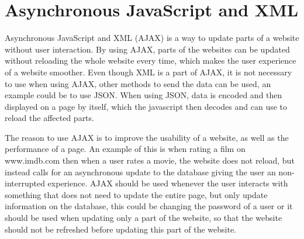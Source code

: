 \section{Asynchronous JavaScript and XML}
Asynchronous JavaScript and XML (AJAX) is a way to update parts of a website without user interaction.
By using AJAX, parts of the websites can be updated without reloading the whole website every time, which makes the user experience of a website smoother.
Even though XML is a part of AJAX, it is not necessary to use when using AJAX, other methods to send the data can be used, an example could be to use JSON.
When using JSON, data is encoded and then displayed on a page by itself, which the javascript then decodes and can use to reload the affected parts.

The reason to use AJAX is to improve the usability of a website, as well as the performance of a page.
An example of this is when rating a film on www.imdb.com \citep{misc:imdb} then when a user rates a movie, the website does not reload, but instead calls for an asynchronous update to the database giving the user an non-interrupted experience.
AJAX should be used whenever the user interacts with something that does not need to update the entire page, but only update information on the database, this could be changing the password of a user or it should be used when updating only a part of the website, so that the website should not be refreshed before updating this part of the website.